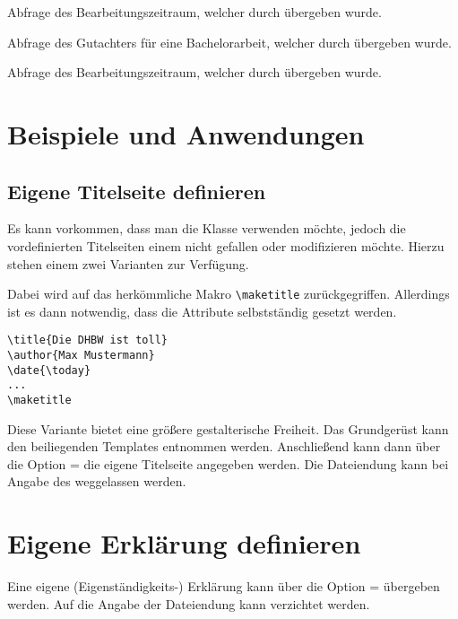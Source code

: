 \documentclass[babel=ngerman,highlight=false]{skdoc}
\begin{document}
            \DescribeMacro\getProcessingPeriod Abfrage des Bearbeitungszeitraum, welcher durch  übergeben wurde.
            
            \DescribeMacro\getReviewer Abfrage des Gutachters für eine Bachelorarbeit, welcher durch  übergeben wurde.
            
            \DescribeMacro\getBachelorDegree Abfrage des Bearbeitungszeitraum, welcher durch  übergeben wurde.

    \section{Beispiele und Anwendungen}
        \subsection{Eigene Titelseite definieren}
            Es kann vorkommen, dass man die Klasse verwenden möchte, jedoch die vordefinierten Titelseiten einem nicht gefallen oder modifizieren möchte. Hierzu stehen einem zwei Varianten zur Verfügung.

            Dabei wird auf das herkömmliche Makro \verb|\maketitle| zurückgegriffen. Allerdings ist es dann notwendig, dass die Attribute selbstständig gesetzt werden.
            \begin{verbatim}
\title{Die DHBW ist toll}
\author{Max Mustermann}
\date{\today}
...
\maketitle
            \end{verbatim}

            Diese Variante bietet eine größere gestalterische Freiheit. Das Grundgerüst kann den beiliegenden Templates entnommen werden. Anschließend kann dann über die Option  =  die eigene Titelseite angegeben werden. Die Dateiendung kann bei Angabe des  weggelassen werden.

        \section{Eigene Erklärung definieren}
            Eine eigene (Eigenständigkeits-) Erklärung kann über die Option  =  übergeben werden. Auf die Angabe der Dateiendung kann verzichtet werden.
\end{document}
